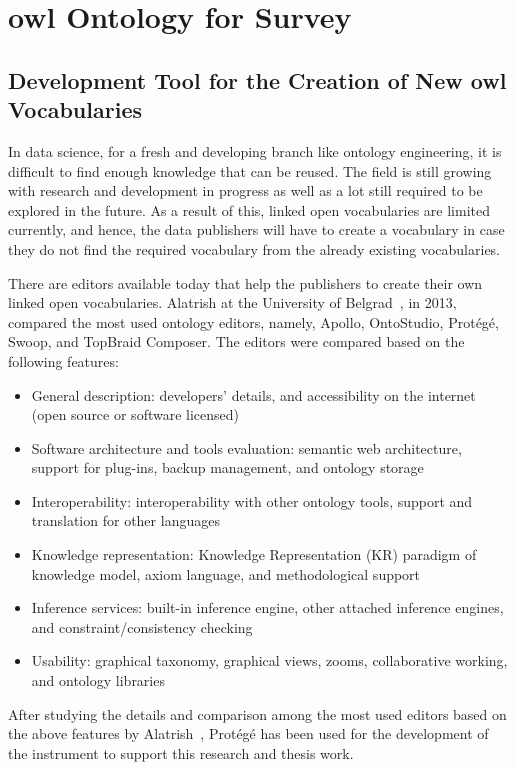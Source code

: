 
\chapter{\ac{owl} Ontology for Survey}
\label{chap:ontology}
\begin{doublespace}
\section{Development Tool for the Creation of New \ac{owl} Vocabularies}
\par In data science, for a fresh and developing branch like ontology engineering, it is difficult to find enough knowledge that can be reused. The field is still growing with research and development in progress as well as a lot still required to be explored in the future. As a result of this, linked open vocabularies are limited currently, and hence, the data publishers will have to create a vocabulary in case they do not find the required vocabulary from the already existing vocabularies.
\par There are editors available today that help the publishers to create their own linked open vocabularies. Alatrish at the University of Belgrad~\cite{alatrish2013comparison}, in 2013, compared the most used ontology editors, namely, Apollo, OntoStudio, Protégé, Swoop, and TopBraid Composer. The editors were compared based on the following features:
\begin{itemize}
  \item General description: developers' details, and accessibility on the internet (open source or software licensed)
  \item Software architecture and tools evaluation: semantic web architecture, support for plug-ins, backup management, and ontology storage
  \item Interoperability: interoperability with other ontology tools, support and translation for other languages
  \item Knowledge representation: Knowledge Representation (KR) paradigm of knowledge model, axiom language, and methodological support
  \item Inference services: built-in inference engine, other attached inference engines, and constraint/consistency checking
  \item Usability: graphical taxonomy, graphical views, zooms, collaborative working, and ontology libraries
\end{itemize}
\par After studying the details and comparison among the most used editors based on the above features by Alatrish~\cite{alatrish2013comparison}, Protégé has been used for the development of the instrument to support this research and thesis work.

\end{doublespace}
